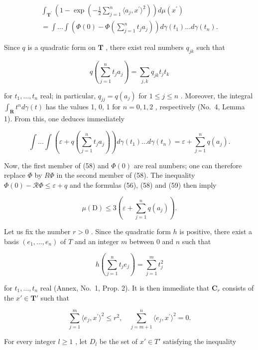 \[
\begin{array}{l} \int_ {\mathbf {T} ^ {\prime}} \left(1 - \exp \left(- \frac {1}{2} \sum_ {j = 1} ^ {n} \langle a _ {j}, x ^ {\prime} \rangle^ {2}\right)\right) d \mu (x ^ {\prime}) \\ = \int \dots \int \left(\Phi (0) - \Phi \left(\sum_ {j = 1} ^ {n} t _ {j} a _ {j}\right)\right) d \gamma (t _ {1}) \dots d \gamma (t _ {n}). \end{array}\tag{58}
\]

Since \(q\) is a quadratic form on \(\mathbf{T}\) , there exist real numbers \(q_{jk}\) such that

\[
q \left(\sum_ {j = 1} ^ {n} t _ {j} a _ {j}\right) = \sum_ {j, k} q _ {j k} t _ {j} t _ {k}
\]

for \(t_1, \ldots, t_n\) real; in particular, \(q_{jj} = q(a_j)\) for \(1 \leqslant j \leqslant n\) . Moreover, the integral \(\int_{\mathbf{R}} t^n d\gamma(t)\) has the values 1, 0, 1 for \(n = 0, 1, 2\) , respectively (No.~4, Lemma 1). From this, one deduces immediately

\[
\int \dots \int \left(\varepsilon + q \left(\sum_ {j = 1} ^ {n} t _ {j} a _ {j}\right)\right) d \gamma (t _ {1}) \dots d \gamma (t _ {n}) = \varepsilon + \sum_ {j = 1} ^ {n} q (a _ {j}).\tag{59}
\]

Now, the first member of (58) and \(\Phi(0)\) are real numbers; one can therefore replace \(\Phi\) by \(R\Phi\) in the second member of (58). The inequality \(\Phi(0)-\mathcal{R}\Phi\leqslant\varepsilon+q\) and the formulas (56), (58) and (59) then imply

\[
\mu (\mathrm{D}) \leqslant 3 \left(\varepsilon + \sum_ {j = 1} ^ {n} q (a _ {j})\right).\tag{60}
\]

Let us fix the number \(r > 0\) . Since the quadratic form \(h\) is positive, there exist a basis \((e_1, \ldots, e_n)\) of \(T\) and an integer \(m\) between 0 and \(n\) such that

\[
h \left(\sum_ {j = 1} ^ {n} t _ {j} e _ {j}\right) = \sum_ {j = 1} ^ {m} t _ {j} ^ {2}
\]

for \(t_1, \ldots, t_n\) real (Annex, No.~1, Prop. 2). It is then immediate that \(\mathbf{C}_r\) consists of the \(x' \in \mathbf{T}'\) such that

\[
\sum_ {j = 1} ^ {m} \langle e _ {j}, x ^ {\prime} \rangle^ {2} \leqslant r ^ {2}, \quad \sum_ {j = m + 1} ^ {n} \langle e _ {j}, x ^ {\prime} \rangle^ {2} = 0.
\]

For every integer \(l \geqslant 1\) , let \(D_l\) be the set of \(x' \in T'\) satisfying the inequality

